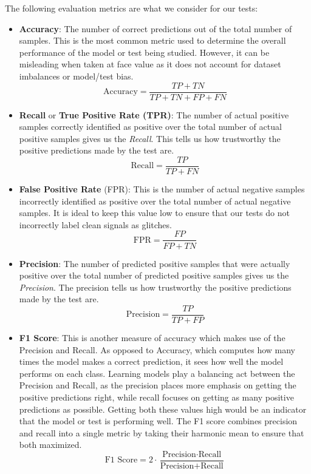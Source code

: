 \documentclass[12pt]{article}
\begin{document}
\noindent The following evaluation metrics are what we consider for our tests:

\begin{itemize}
  \item \textbf{Accuracy}: The number of correct predictions out of the total number of samples. This is the most common metric used to determine the overall performance of the model or test being studied. However, it can be misleading when taken at face value as it does not account for dataset imbalances or model/test bias.
    \begin{equation}
      \text{Accuracy} = \frac{TP + TN}{TP + TN + FP + FN}
    \end{equation}
  \item \textbf{Recall} or \textbf{True Positive Rate (TPR)}: The number of actual positive samples correctly identified as positive over the total number of actual positive samples gives us the \textit{Recall}. This tells us how trustworthy the positive predictions made by the test are.
    \begin{equation}
      \text{Recall} = \frac{TP}{TP + FN}
    \end{equation}
  \item \textbf{False Positive Rate} (FPR): This is the number of actual negative samples incorrectly identified as positive over the total number of actual negative samples. It is ideal to keep this value low to ensure that our tests do not incorrectly label clean signals as glitches.
    \begin{equation}
      \text{FPR} = \frac{FP}{FP + TN}
    \end{equation}
  \item \textbf{Precision}: The number of predicted positive samples that were actually positive over the total number of predicted positive samples gives us the \textit{Precision}. The precision tells us how trustworthy the positive predictions made by the test are.
    \begin{equation}
      \text{Precision} = \frac{TP}{TP + FP}
    \end{equation}
  \item \textbf{F1 Score}: This is another measure of accuracy which makes use of the Precision and Recall. As opposed to Accuracy, which computes how many times the model makes a correct prediction, it sees how well the model performs on each class. Learning models play a balancing act between the Precision and Recall, as the precision places more emphasis on getting the positive predictions right, while recall focuses on getting as many positive predictions as possible. Getting both these values high would be an indicator that the model or test is performing well. The F1 score combines precision and recall into a single metric by taking their harmonic mean to ensure that both maximized.
    \begin{equation}
      \text{F1 Score} = 2 \cdot \frac{\text{Precision} \cdot \text{Recall}}{\text{Precision} + \text{Recall}}
    \end{equation}
\end{itemize}
\end{document}
